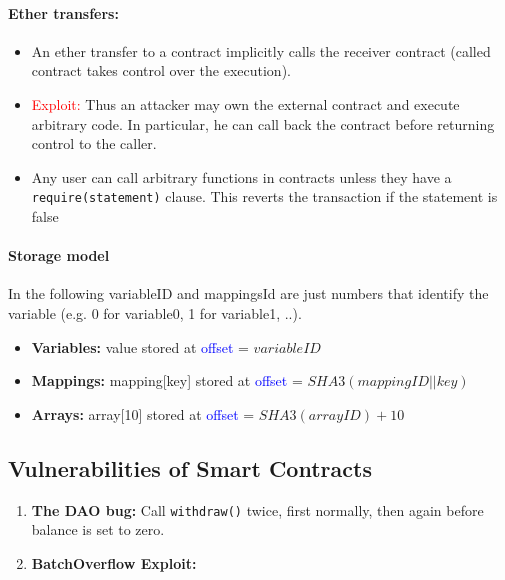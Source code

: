 \paragraph{Ether transfers:}
\begin{itemize}
    \item An ether transfer to a contract implicitly calls the receiver contract (called contract takes control over the execution).
    \item[\color{red}{$\xrightarrow{}$}] \textcolor{red}{Exploit:} Thus an attacker may own the external contract and execute arbitrary code. In particular, he can call back the contract before returning control to the caller.
    \item Any user can call arbitrary functions in contracts unless they have a \texttt{require(statement)} clause. This reverts the transaction if the statement is false
\end{itemize}{}

\begin{minipage}{0.75\linewidth}
    \centering      
    \def\svgwidth{\linewidth}
        
\end{minipage}

\paragraph{Storage model} In the following variableID and mappingsId are just numbers that identify the variable (e.g. 0 for variable0, 1 for variable1, ..). 
\begin{itemize}
    \item \textbf{Variables:} value stored at \textcolor{blue}{offset} = $variableID$
    \item \textbf{Mappings:} mapping[key] stored at \textcolor{blue}{offset} = $SHA3(mappingID||key)$ 
    \item \textbf{Arrays:} array[10] stored at \textcolor{blue}{offset} = $SHA3(arrayID) + 10$
\end{itemize}{}

\subsection{Vulnerabilities of Smart Contracts}

\begin{enumerate}
    \item \textbf{The DAO bug:} Call \texttt{withdraw()} twice, first normally, then again before balance is set to zero.
    \item \textbf{BatchOverflow Exploit: }
\end{enumerate}{}

